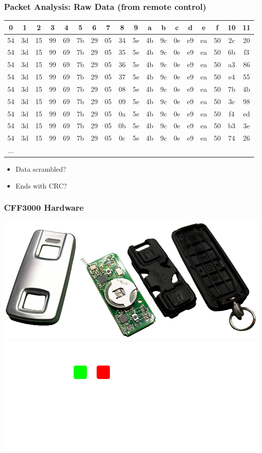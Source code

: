 \documentclass[aspectratio=169]{beamer}
\begin{document}
\begin{frame}
	\frametitle{Packet Analysis: Raw Data (from remote control)}

\begin{scriptsize}
\begin{tabular}{cccccccc>{\columncolor[RGB]{42, 42, 42}}cccccccc>{\columncolor[RGB]{42, 42, 42}}c>{\columncolor[RGB]{42, 42, 42}}c}
0 & 1 & 2 & 3 & 4 & 5 & 6 & 7 & 8 & 9 & a & b & c & d & e & f & 10 & 11\\
\hline
54 & 3d & 15 & 99 & 69 & 7b & 29 & 05 & 34 & 5e & 4b & 9c & 0e & e9 & ea & 50 & 2c & 20\\
54 & 3d & 15 & 99 & 69 & 7b & 29 & 05 & 35 & 5e & 4b & 9c & 0e & e9 & ea & 50 & 6b & f3\\
54 & 3d & 15 & 99 & 69 & 7b & 29 & 05 & 36 & 5e & 4b & 9c & 0e & e9 & ea & 50 & a3 & 86\\
54 & 3d & 15 & 99 & 69 & 7b & 29 & 05 & 37 & 5e & 4b & 9c & 0e & e9 & ea & 50 & e4 & 55\\
54 & 3d & 15 & 99 & 69 & 7b & 29 & 05 & 08 & 5e & 4b & 9c & 0e & e9 & ea & 50 & 7b & 4b\\
54 & 3d & 15 & 99 & 69 & 7b & 29 & 05 & 09 & 5e & 4b & 9c & 0e & e9 & ea & 50 & 3c & 98\\
54 & 3d & 15 & 99 & 69 & 7b & 29 & 05 & 0a & 5e & 4b & 9c & 0e & e9 & ea & 50 & f4 & ed\\
54 & 3d & 15 & 99 & 69 & 7b & 29 & 05 & 0b & 5e & 4b & 9c & 0e & e9 & ea & 50 & b3 & 3e\\
54 & 3d & 15 & 99 & 69 & 7b & 29 & 05 & 0c & 5e & 4b & 9c & 0e & e9 & ea & 50 & 74 & 26\\
...\\
\end{tabular}
\end{scriptsize}

	\begin{itemize}
		\item Data scrambled?
		\item Ends with CRC?
	\end{itemize}
\end{frame}

\begin{frame}
	\frametitle{CFF3000 Hardware}
		\begin{center}
			\includegraphics[width=0.6\textwidth]{cff3000-opened.png}
			\includegraphics[width=0.6\textwidth]{cff3000-block-diagram.pdf}
		\end{center}
\end{frame}
\end{document}
